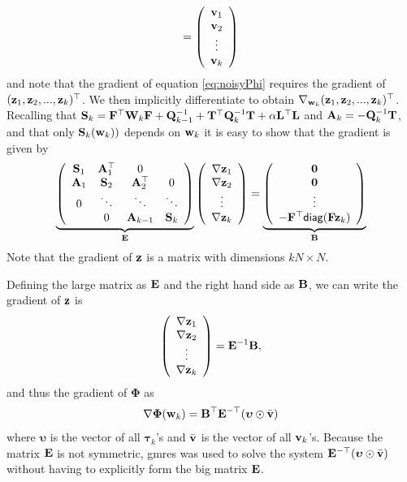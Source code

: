 \documentclass[english]{siamltex}
\newcommand{\bfA}	{{\bf{A}}}
\newcommand{\bfB}	{{\bf{B}}}
\newcommand{\bfE}	{{\bf{E}}}
\newcommand{\bfF}	{{\bf{F}}}
\newcommand{\bfL}	{{\bf{L}}}
\newcommand{\bfQ}	{{\bf{Q}}}
\newcommand{\bfS}	{{\bf{S}}}
\newcommand{\bfT}	{{\bf{T}}}
\newcommand{\bfW}	{{\bf{W}}}
\newcommand{\bfv}	{{\bf{v}}}
\newcommand{\bfw}	{{\bf{w}}}
\newcommand{\bfz}	{{\bf{z}}}
\newcommand{\bfPhi}     {{\boldsymbol \Phi}}
\newcommand{\bftau}      {{\boldsymbol \tau}}
\newcommand{\bfupsilon}      {{\boldsymbol \upsilon}}
\newcommand{\LtL}       { \bfL^{\top}\bfL}
\newcommand {\zero}  { {\bf 0} }
\newcommand{\grad}	{\ensuremath {{\bf{ \nabla}}}}
\begin{document}
{\begin{equation}
  =
  \left(\begin{array}{c} \bfv_1 \\ \bfv_2\\ \vdots\\ \bfv_k \end{array}\right)
\end{equation}
and note that the gradient of equation \eqref{eq:noisyPhi} requires the gradient of $(\bfz_1,\bfz_2,...,\bfz_k)^{\top}$. We then implicitly differentiate to obtain $\nabla_{\bfw_k} (\bfz_1,\bfz_2,...,\bfz_k)^{\top}$. Recalling that $\bfS_k = \bfF^{\top}\bfW_{k}\bfF + \bfQ^{-1}_{k-1} + \bfT^{\top}\bfQ^{-1}_{k}\bfT +\alpha\LtL$  and $\bfA_k = -\bfQ^{-1}_k \bfT$, and that only $\bfS_k(\bfw_k))$ depends on $\bfw_k$ it is easy to show that the gradient is given by 
\begin{equation}
\label{eq:gradSys}
\underbrace{\left(\begin{array}{cccc}
 \bfS_1 &  \bfA^{\top}_1 & 0 & \\
 \bfA_1 & \bfS_2 & \bfA^{\top}_2 & 0 \\
 0 & \ddots & \ddots & \ddots \\
 & 0 & \bfA_{k-1} & \bfS_k
  \end{array}\right)}_{\bfE}
  \left(\begin{array}{c} \grad\bfz_1 \\ \grad\bfz_2\\ \vdots\\ \grad\bfz_k \end{array}\right)
  =
  \underbrace{\left(\begin{array}{c} \zero \\ \zero\\ \vdots\\ -\bfF^{\top}{\sf diag}(\bfF\bfz_k) \end{array}\right)}_{\bfB}
\end{equation}
Note that the gradient of $\bfz$ is a matrix with dimensions $kN\times  N$. 

Defining the large matrix as $\bfE$ and the right hand side as $\bfB$, we can write the gradient of $\bfz$ is 
\begin{equation}
\left(\begin{array}{c} \grad\bfz_1 \\ \grad\bfz_2\\ \vdots\\ \grad\bfz_k \end{array}\right) = \bfE^{-1}\bfB,
\end{equation}
and thus the gradient of $\bfPhi$ as
\begin{equation}
\nabla \bfPhi(\bfw_k) = \bfB^{\top}\bfE^{- \top}(\bfupsilon \odot \bar{\bfv})
\end{equation}
where $\bfupsilon$ is the vector of all $\bftau_k$'s and $\bar{\bfv}$ is the vector of all $\bfv_k$'s.
Because the matrix $\bfE$ is not symmetric, gmres was used to solve the system $\bfE^{-\top}(\bfupsilon \odot \bar{\bfv})$ without having to explicitly form the big matrix $\bfE$.
 





}
\end{document}
